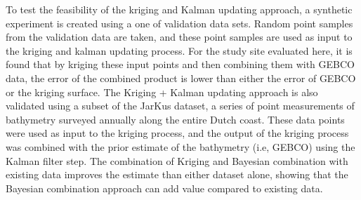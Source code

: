 To test the feasibility of the kriging and Kalman updating approach, a synthetic experiment is created using a one of validation data sets. Random point samples from the validation data are taken, and these point samples are used as input to the kriging and kalman updating process. For the study site evaluated here, it is found that by kriging these input points and then combining them with GEBCO data, the error of the combined product is lower than either the error of GEBCO or the kriging surface. The Kriging + Kalman updating approach is also validated using a subset of the JarKus dataset, a series of point measurements of bathymetry surveyed annually along the entire Dutch coast. These data points were used as input to the kriging process, and the output of the kriging process was combined with the prior estimate of the bathymetry (i.e, GEBCO) using the Kalman filter step. The combination of Kriging and Bayesian combination with existing data improves the estimate than either dataset alone, showing that the Bayesian combination approach can add value compared to existing data.
\vskip 0.1in

